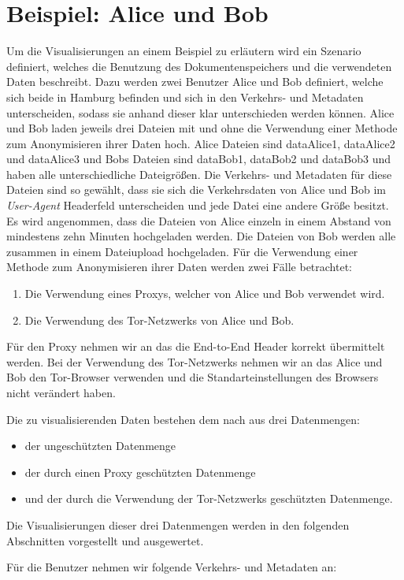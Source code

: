 \documentclass[
    fontsize=12pt,
    headings=small,
    parskip=half,           %
    bibliography=totoc,
    numbers=noenddot,       %
    open=any,               %
    ]{scrreprt}
\begin{document}
    \section{Beispiel: Alice und Bob} \label{AliceBob}
Um die Visualisierungen an einem Beispiel zu erläutern wird ein Szenario definiert, welches die Benutzung des Dokumentenspeichers und die verwendeten Daten beschreibt.
Dazu werden zwei Benutzer Alice und Bob definiert, welche sich beide in Hamburg befinden und sich in den Verkehrs- und Metadaten unterscheiden, sodass sie anhand dieser klar unterschieden werden können.
Alice und Bob laden jeweils drei Dateien mit und ohne die Verwendung einer Methode zum Anonymisieren ihrer Daten hoch.
Alice Dateien sind dataAlice1, dataAlice2 und dataAlice3 und Bobs Dateien sind dataBob1, dataBob2 und dataBob3 und haben alle unterschiedliche Dateigrößen.
Die Verkehrs- und Metadaten für diese Dateien sind so gewählt, dass sie sich die Verkehrsdaten von Alice und Bob im \textit{User-Agent} Headerfeld unterscheiden und jede Datei eine andere Größe besitzt.
Es wird angenommen, dass die Dateien von Alice einzeln in einem Abstand von mindestens zehn Minuten hochgeladen werden.
Die Dateien von Bob werden alle zusammen in einem Dateiupload hochgeladen.
Für die Verwendung einer Methode zum Anonymisieren ihrer Daten werden zwei Fälle betrachtet:
\begin{enumerate}
\item Die Verwendung eines Proxys, welcher von Alice und Bob verwendet wird.
\item Die Verwendung des Tor-Netzwerks von Alice und Bob.
\end{enumerate}
Für den Proxy nehmen wir an das die End-to-End Header korrekt übermittelt werden.
Bei der Verwendung des Tor-Netzwerks nehmen wir an das Alice und Bob den Tor-Browser verwenden und die Standarteinstellungen des Browsers nicht verändert haben.

Die zu visualisierenden Daten bestehen dem nach aus drei Datenmengen:
\begin{itemize}
\item der ungeschützten Datenmenge
\item der durch einen Proxy geschützten Datenmenge
\item und der durch die Verwendung der Tor-Netzwerks geschützten Datenmenge.
\end{itemize}
Die Visualisierungen dieser drei Datenmengen werden in den folgenden Abschnitten vorgestellt und ausgewertet.

Für die Benutzer nehmen wir folgende Verkehrs- und Metadaten an: 
\end{document}
